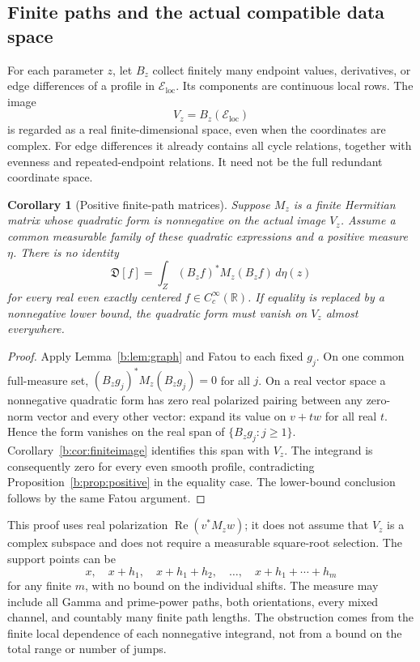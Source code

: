 \documentclass[11pt,a4paper]{article}
\numberwithin{equation}{section}
\newtheorem{corollary}[theorem]{Corollary}
\theoremstyle{definition}\newtheorem{definition}[theorem]{Definition}
\theoremstyle{remark}\newtheorem{remark}[theorem]{Remark}
\newcommand{\R}{\mathbb R}\newcommand{\C}{\mathbb C}\newcommand{\N}{\mathbb N}
\newcommand{\Eloc}{\mathcal E_{\mathrm{loc}}}\newcommand{\Def}{\mathfrak D}
\begin{document}
\subsection{Finite paths and the actual compatible data space}\label{b:sec:paths}

For each parameter $z$, let $B_z$ collect finitely many endpoint values, derivatives, or edge differences of a profile in $\Eloc$. Its components are continuous local rows. The image
\[
 V_z=B_z(\Eloc)
\]
is regarded as a real finite-dimensional space, even when the coordinates are complex. For edge differences it already contains all cycle relations, together with evenness and repeated-endpoint relations. It need not be the full redundant coordinate space.

\begin{corollary}[Positive finite-path matrices]\label{b:cor:paths}
Suppose $M_z$ is a finite Hermitian matrix whose quadratic form is nonnegative on the actual image $V_z$. Assume a common measurable family of these quadratic expressions and a positive measure $\eta$. There is no identity
\begin{equation}\label{b:eq:matrixidentity}
 \Def[f]=\int_Z(B_zf)^*M_z(B_zf)\,d\eta(z)
\end{equation}
for every real even exactly centered $f\in C_c^\infty(\R)$. If equality is replaced by a nonnegative lower bound, the quadratic form must vanish on $V_z$ almost everywhere.
\end{corollary}
\begin{proof}
Apply Lemma~\ref{b:lem:graph} and Fatou to each fixed $g_j$. On one common full-measure set,
$(B_zg_j)^*M_z(B_zg_j)=0$ for all $j$. On a real vector space a nonnegative quadratic form has zero real polarized pairing between any zero-norm vector and every other vector: expand its value on $v+tw$ for all real $t$. Hence the form vanishes on the real span of $\{B_zg_j:j\ge1\}$. Corollary~\ref{b:cor:finiteimage} identifies this span with $V_z$. The integrand is consequently zero for every even smooth profile, contradicting Proposition~\ref{b:prop:positive} in the equality case. The lower-bound conclusion follows by the same Fatou argument.
\end{proof}

This proof uses real polarization $\operatorname{Re}(v^*M_zw)$; it does not assume that $V_z$ is a complex subspace and does not require a measurable square-root selection. The support points can be
\[
 x,\quad x+h_1,\quad x+h_1+h_2,\quad\ldots,\quad x+h_1+\cdots+h_m
\]
for any finite $m$, with no bound on the individual shifts. The measure may include all Gamma and prime-power paths, both orientations, every mixed channel, and countably many finite path lengths. The obstruction comes from the finite local dependence of each nonnegative integrand, not from a bound on the total range or number of jumps.
\end{document}
